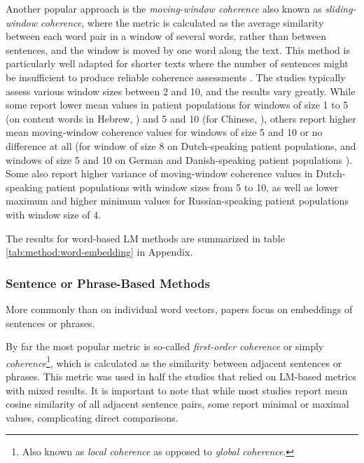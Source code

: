 Another popular approach is the \textit{moving-window coherence} also known as \textit{sliding-window coherence}, where the metric is calculated as the average similarity between each word pair in a window of several words, rather than between sentences, and the window is moved by one word along the text. This method is particularly well adapted for shorter texts where the number of sentences might be insufficient to produce reliable coherence assessments \citep{panicheva2019semantic}. The studies typically assess various window sizes between 2 and 10, and the results vary greatly. While some report lower mean values in patient populations for windows of size 1 to 5 (on content words in Hebrew, \cite{bar2019semantic}) and 5 and 10 (for Chinese, \cite{parola2022speech}), others report higher mean moving-window coherence values for windows of size 5 and 10 \citep{alonso2022language, alonso2022progressive} or no difference at all (for window of size 8 on Dutch-speaking patient populations, \cite{dore2019quantification} and windows of size 5 and 10 on German and Danish-speaking patient populations \cite{parola2022speech}). Some also report higher variance of moving-window coherence values in Dutch-speaking patient populations \citep{voppel2021quantified, voppel2023semantic} with window sizes from 5 to 10, as well as lower maximum and higher minimum values for Russian-speaking patient populations \citep{panicheva2019semantic} with window size of 4. 

The results for word-based LM methods are summarized in table \ref{tab:method:word-embedding} in Appendix.

\subsubsection{Sentence or Phrase-Based Methods}

More commonly than on individual word vectors, papers focus on embeddings of sentences or phrases. 


By far the most popular metric is so-called \textit{first-order coherence} or simply \textit{coherence}\footnote{Also known as \textit{local coherence} as opposed to \textit{global coherence}.}, which is calculated as the similarity between adjacent sentences or phrases. This metric was used in half the studies that relied on LM-based metrics with mixed results. It is important to note that while most studies report mean cosine similarity of all adjacent sentence pairs, some report minimal or maximal values, complicating direct comparisons.

